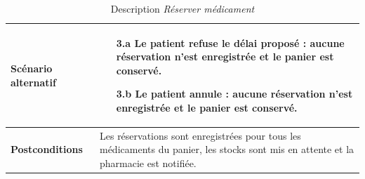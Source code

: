 \documentclass[12pt,a4paper]{report}
\begin{document}
\begin{table}[H]
\begin{tabular}{|p{4cm}|p{9cm}|}
        \hline
        \textbf{Scénario alternatif} &
        \begin{enumerate}
            \item[3.a] Le patient refuse le délai proposé : aucune réservation n'est enregistrée et le panier est conservé.
            \item[3.b] Le patient annule : aucune réservation n'est enregistrée et le panier est conservé.
        \end{enumerate} \\
        \hline
        \textbf{Postconditions} & Les réservations sont enregistrées pour tous les médicaments du panier, les stocks sont mis en attente et la pharmacie est notifiée. \\
        \hline
    \end{tabular}
    \caption{Description \textit{Réserver médicament}}
\end{table}

\end{document}
